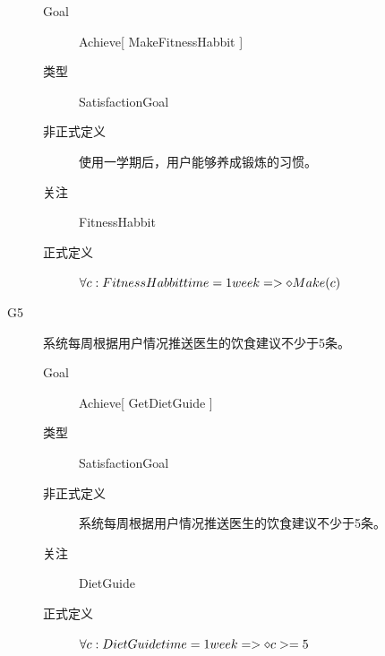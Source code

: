 \documentclass[UTF8]{ctexart}
\begin{document}
\begin{description}
   \begin{description}
      \item[Goal] Achieve[ MakeFitnessHabbit ]
      \item[类型] SatisfactionGoal
      \item[非正式定义] 使用一学期后，用户能够养成锻炼的习惯。
      \item[关注] FitnessHabbit
      \item[正式定义] $\forall c:FitnessHabbit\\ time=1week\\ =>\diamond Make(c)$
   \end{description}
   \item[G5] 系统每周根据用户情况推送医生的饮食建议不少于5条。
   \begin{description}
   \item[Goal] Achieve[ GetDietGuide ]
   \item[类型] SatisfactionGoal
   \item[非正式定义] 系统每周根据用户情况推送医生的饮食建议不少于5条。
   \item[关注] DietGuide
   \item[正式定义] $\forall c:DietGuide\\ time=1week\\ =>\diamond c>=5$
   \end{description}
\end{description}
\end{document}
